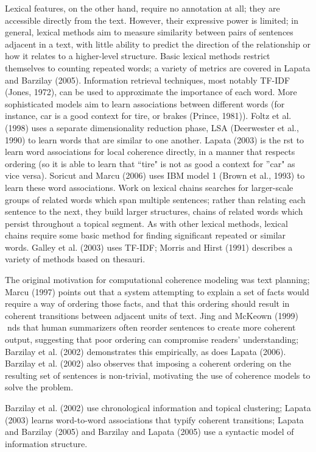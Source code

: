 Lexical features, on the other hand, require no annotation at all; they are accessible directly from the text.
However, their expressive power is limited; in general, lexical methods aim to measure similarity between
pairs of sentences adjacent in a text, with little ability to predict the direction of the relationship or how it
relates to a higher-level structure. Basic lexical methods restrict themselves to counting repeated words; a
variety of metrics are covered in Lapata and Barzilay (2005). Information retrieval techniques, most notably
TF-IDF (Jones, 1972), can be used to approximate the importance of each word. More sophisticated models
aim to learn associations between different words (for instance, car is a good context for tire, or brakes
(Prince, 1981)). Foltz et al. (1998) uses a separate dimensionality reduction phase, LSA (Deerwester et al.,
1990) to learn words that are similar to one another. Lapata (2003) is the rst to learn word associations for
local coherence directly, in a manner that respects ordering (so it is able to learn that ``tire" is not as good a
context for ''car" as vice versa). Soricut and Marcu (2006) uses IBM model 1 (Brown et al., 1993) to learn
these word associations.
Work on lexical chains searches for larger-scale groups of related words which span multiple sentences;
rather than relating each sentence to the next, they build larger structures, chains of related words which
persist throughout a topical segment. As with other lexical methods, lexical chains require some basic method
for finding significant repeated or similar words. Galley et al. (2003) uses TF-IDF; Morris and Hirst (1991)
describes a variety of methods based on thesauri.

The original motivation for computational coherence modeling was text planning; Marcu (1997) points out
that a system attempting to explain a set of facts would require a way of ordering those facts, and that this
ordering should result in coherent transitions between adjacent units of text.
Jing and McKeown
(1999) nds that human summarizers often reorder sentences to create more coherent output, suggesting that
poor ordering can compromise readers' understanding; Barzilay et al. (2002) demonstrates this empirically,
as does Lapata (2006). Barzilay et al. (2002) also observes that imposing a coherent ordering on the resulting
set of sentences is non-trivial, motivating the use of coherence models to solve the problem. 

Barzilay et al. (2002) use chronological information and topical clustering; Lapata (2003) learns word-to-word associations that typify coherent transitions;
Lapata and Barzilay (2005) and Barzilay and Lapata (2005) use a syntactic model of information structure.

